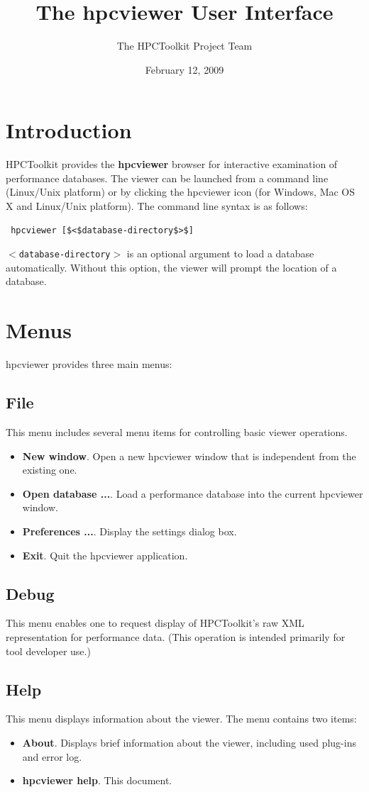 \documentclass[a4paper,11pt]{article}
\title{The hpcviewer User Interface}
\author{The HPCToolkit Project Team}
\date{February 12, 2009}
\begin{document}
\section{Introduction}

 HPCToolkit provides the \textbf{hpcviewer} browser for interactive examination of  performance databases. The viewer can be launched from a command line (Linux/Unix platform) or by clicking  the hpcviewer icon (for Windows, Mac OS X and Linux/Unix platform). The command line syntax is as follows:   
\begin{verbatim}
 hpcviewer [$<$database-directory$>$]
\end{verbatim}
\texttt{$<$database-directory$>$} is an optional argument to load a database automatically.  Without this option, the viewer will prompt the location of a database. 

\section{Menus} hpcviewer provides three main menus:    

\subsection{File}
   This menu includes several menu items for controlling basic viewer   operations.     
\begin{itemize}
	\item \textbf{New window}. Open a new hpcviewer window that is   independent from the existing one. 
	\item \textbf{Open database ...}. Load a performance database   into the current hpcviewer window.
	\item \textbf{Preferences ...}. Display the settings dialog box.
	\item \textbf{Exit}. Quit the hpcviewer application.
\end{itemize}

\subsection{Debug}
   This menu enables one to request display of HPCToolkit's raw XML   representation for performance data. (This operation is intended   primarily for tool developer use.)     

\subsection{Help} 
  This menu displays information about the viewer. The menu contains   two items:     
\begin{itemize}
	\item \textbf{About}. Displays brief information about the viewer, including used plug-ins and error log. 
	\item \textbf{hpcviewer help}. This document. 
\end{itemize}
\end{document}
